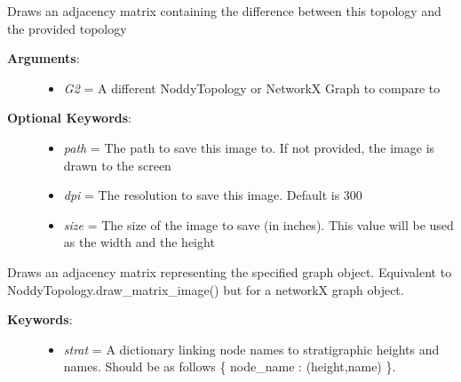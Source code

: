 \documentclass[a4paper,10pt,english]{sphinxmanual}
\begin{document}
\begin{fulllineitems}
\begin{fulllineitems}
\begin{description}
\begin{itemize}
\end{itemize}

\end{description}

\end{fulllineitems}


\begin{fulllineitems}
\label{pynoddy:pynoddy.output.NoddyTopology.draw_difference_matrix}
Draws an adjacency matrix containing the difference between this topology and the provided topology
\begin{description}
\item[{\textbf{Arguments}:}] \leavevmode\begin{itemize}
\item {} 
\emph{G2} = A different NoddyTopology or NetworkX Graph to compare to

\end{itemize}

\item[{\textbf{Optional Keywords}:}] \leavevmode\begin{itemize}
\item {} 
\emph{path} = The path to save this image to. If not provided, the image is drawn to the screen

\item {} 
\emph{dpi} = The resolution to save this image. Default is 300

\item {} 
\emph{size} = The size of the image to save (in inches). This value will be used as the width and the height

\end{itemize}

\end{description}

\end{fulllineitems}


\begin{fulllineitems}
\label{pynoddy:pynoddy.output.NoddyTopology.draw_graph_matrix}
Draws an adjacency matrix representing the specified graph object. Equivalent to
NoddyTopology.draw\_matrix\_image() but for a networkX graph object.
\begin{description}
\item[{\textbf{Keywords}:}] \leavevmode\begin{itemize}
\item {} 
\emph{strat} = A dictionary linking node names to stratigraphic heights and names. Should be as follows \{ node\_name : (height,name) \}.


\end{itemize}
\end{description}
\end{fulllineitems}
\end{fulllineitems}
\end{document}
